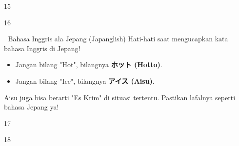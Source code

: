 \begin{convobox}{15}
    \noindent
      
     

    \vspace{1.5em}
\end{convobox}

\begin{convobox}{16}
    \noindent

    \vspace{1.5em}
\end{convobox}

\begin{lessonbox}{🧊 Bahasa Inggris ala Jepang (Japanglish)}
    Hati-hati saat mengucapkan kata bahasa Inggris di Jepang! 
    \begin{itemize}
        \item Jangan bilang "Hot", bilangnya \textbf{ホット (Hotto)}.
        \item Jangan bilang "Ice", bilangnya \textbf{アイス (Aisu)}.
    \end{itemize}
    Aisu juga bisa berarti "Es Krim" di situasi tertentu. Pastikan lafalnya seperti bahasa Jepang ya!
\end{lessonbox}

\begin{convobox}{17}
    \noindent
       
     

    \vspace{1.5em}
\end{convobox}

\begin{convobox}{18}
    \noindent

    \vspace{1.5em}
\end{convobox}

